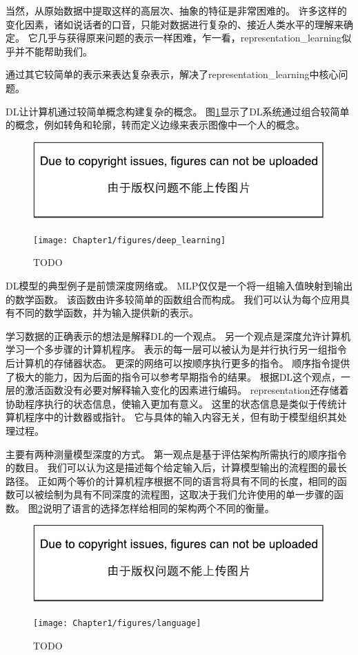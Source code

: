当然，从原始数据中提取这样的高层次、抽象的特征是非常困难的。
许多这样的变化因素，诸如说话者的口音，只能对数据进行复杂的、接近人类水平的理解来确定。
它几乎与获得原来问题的表示一样困难，乍一看，\gls{representation_learning}似乎并不能帮助我们。

通过其它较简单的表示来表达复杂表示，解决了\gls{representation_learning}中核心问题。

\gls{DL}让计算机通过较简单概念构建复杂的概念。
图\ref{fig:chap1_deep_learning}显示了\gls{DL}系统通过组合较简单的概念，例如转角和轮廓，转而定义边缘来表示图像中一个人的概念。
\begin{figure}[!htb]
\ifOpenSource
\centerline{\includegraphics{figure.pdf}}
\else
\centerline{\texttt{[image: Chapter1/figures/deep\_learning]}}
\fi
\caption{TODO}
\label{fig:chap1_deep_learning}
\end{figure}
\gls{DL}模型的典型例子是前馈深度网络或。
\gls{MLP}仅仅是一个将一组输入值映射到输出的数学函数。
该函数由许多较简单的函数组合而构成。
我们可以认为每个应用具有不同的数学函数，并为输入提供新的表示。

学习数据的正确表示的想法是解释\gls{DL}的一个观点。
另一个观点是深度允许计算机学习一个多步骤的计算机程序。
表示的每一层可以被认为是并行执行另一组指令后计算机的存储器状态。
更深的网络可以按顺序执行更多的指令。
顺序指令提供了极大的能力，因为后面的指令可以参考早期指令的结果。
根据\gls{DL}这个观点，一层的激活函数没有必要对解释输入变化的因素进行编码。
\gls{representation}还存储着协助程序执行的状态信息，使输入更加有意义。
这里的状态信息是类似于传统计算机程序中的计数器或指针。
它与具体的输入内容无关，但有助于模型组织其处理过程。


主要有两种测量模型深度的方式。
第一观点是基于评估架构所需执行的顺序指令的数目。
我们可以认为这是描述每个给定输入后，计算模型输出的流程图的最长路径。
正如两个等价的计算机程序根据不同的语言将具有不同的长度，相同的函数可以被绘制为具有不同深度的流程图，这取决于我们允许使用的单一步骤的函数。
图\ref{fig:chap1_language}说明了语言的选择怎样给相同的架构两个不同的衡量。
\begin{figure}[!htb]
\ifOpenSource
\centerline{\includegraphics{figure.pdf}}
\else
\centerline{\texttt{[image: Chapter1/figures/language]}}
\fi
\caption{TODO}
\label{fig:chap1_language}
\end{figure}


